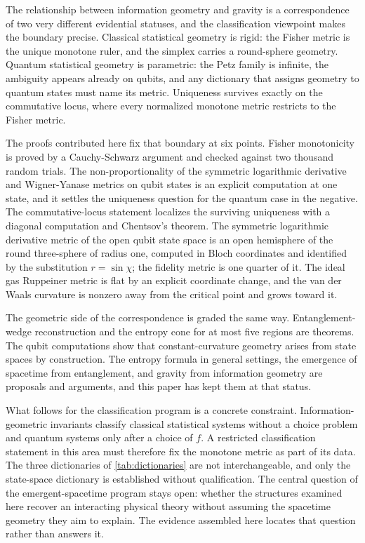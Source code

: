 \documentclass[11pt,letterpaper]{article}
\theoremstyle{definition}
\theoremstyle{remark}
\begin{document}
The relationship between information geometry and gravity is a correspondence of two very different evidential statuses, and the classification viewpoint makes the boundary precise. Classical statistical geometry is rigid: the Fisher metric is the unique monotone ruler, and the simplex carries a round-sphere geometry. Quantum statistical geometry is parametric: the Petz family is infinite, the ambiguity appears already on qubits, and any dictionary that assigns geometry to quantum states must name its metric. Uniqueness survives exactly on the commutative locus, where every normalized monotone metric restricts to the Fisher metric.

The proofs contributed here fix that boundary at six points. Fisher monotonicity is proved by a Cauchy-Schwarz argument and checked against two thousand random trials. The non-proportionality of the symmetric logarithmic derivative and Wigner-Yanase metrics on qubit states is an explicit computation at one state, and it settles the uniqueness question for the quantum case in the negative. The commutative-locus statement localizes the surviving uniqueness with a diagonal computation and Chentsov's theorem. The symmetric logarithmic derivative metric of the open qubit state space is an open hemisphere of the round three-sphere of radius one, computed in Bloch coordinates and identified by the substitution $r = \sin \chi$; the fidelity metric is one quarter of it. The ideal gas Ruppeiner metric is flat by an explicit coordinate change, and the van der Waals curvature is nonzero away from the critical point and grows toward it.

The geometric side of the correspondence is graded the same way. Entanglement-wedge reconstruction and the entropy cone for at most five regions are theorems. The qubit computations show that constant-curvature geometry arises from state spaces by construction. The entropy formula in general settings, the emergence of spacetime from entanglement, and gravity from information geometry are proposals and arguments, and this paper has kept them at that status.

What follows for the classification program is a concrete constraint. Information-geometric invariants classify classical statistical systems without a choice problem and quantum systems only after a choice of $f$. A restricted classification statement in this area must therefore fix the monotone metric as part of its data. The three dictionaries of \cref{tab:dictionaries} are not interchangeable, and only the state-space dictionary is established without qualification. The central question of the emergent-spacetime program stays open: whether the structures examined here recover an interacting physical theory without assuming the spacetime geometry they aim to explain. The evidence assembled here locates that question rather than answers it.
\end{document}
